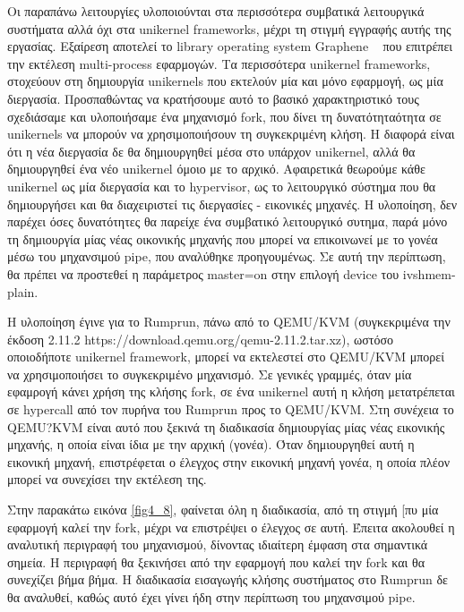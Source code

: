 Οι παραπάνω λειτουργίες υλοποιούνται στα περισσότερα συμβατικά λειτουργικά
συστήματα αλλά όχι στα unikernel frameworks, μέχρι τη στιγμή εγγραφής αυτής της
εργασίας. Εξαίρεση αποτελεί το library operating system Graphene
~\cite{tsai2014cooperation} που επιτρέπει την εκτέλεση multi-process εφαρμογών.
Τα περισσότερα unikernel frameworks, στοχεύουν στη δημιουργία unikernels που
εκτελούν μία και μόνο εφαρμογή, ως μία διεργασία. Προσπαθώντας να κρατήσουμε
αυτό το βασικό χαρακτηριστικό τους σχεδιάσαμε και υλοποιήσαμε ένα μηχανισμό
fork, που δίνει τη δυνατότηταότητα σε unikernels να μπορούν να χρησιμοποιήσουν
τη συγκεκριμένη κλήση. Η διαφορά είναι ότι η νέα διεργασία δε θα δημιουργηθεί
μέσα στο υπάρχον unikernel, αλλά θα δημιουργηθεί ένα νέο unikernel όμοιο με το
αρχικό. Αφαιρετικά θεωρούμε κάθε unikernel ως μία διεργασία και το hypervisor,
ως το λειτουργικό σύστημα που θα δημιουργήσει και θα διαχειριστεί τις διεργασίες
- εικονικές μηχανές. Η υλοποίηση, δεν παρέχει όσες δυνατότητες θα παρείχε ένα
συμβατικό λειτουργικό συτημα, παρά μόνο τη δημιουργία μίας νέας οικονικής
μηχανής που μπορεί να επικοινωνεί με το γονέα μέσω του μηχανσιμού pipe, που
αναλύθηκε προηγουμένως. Σε αυτή την περίπτωση, θα πρέπει να προστεθεί η παράμετρος master=on στην επιλογή device του ivshmem-plain.

Η υλοποίηση έγινε για το Rumprun, πάνω από το QEMU/KVM (συγκεκριμένα την έκδοση
2.11.2 https://download.qemu.org/qemu-2.11.2.tar.xz), ωστόσο οποιοδήποτε
unikernel framework, μπορεί να εκτελεστεί στο QEMU/KVM μπορεί να χρησιμοποιήσει
το συγκεκριμένο μηχανισμό. Σε γενικές γραμμές, όταν μία εφαμρογή κάνει χρήση της
κλήσης fork, σε ένα unikernel αυτή η κλήση μετατρέπεται σε hypercall από τον
πυρήνα του Rumprun προς το QEMU/KVM. Στη συνέχεια το QEMU?KVM είναι αυτό που
ξεκινά τη διαδικασία δημιουργίας μίας νέας εικονικής μηχανής, η οποία είναι ίδια
με την αρχική (γονέα). Όταν δημιουργηθεί αυτή η εικονική μηχανή, επιστρέφεται ο
έλεγχος στην εικονική μηχανή γονέα, η οποία πλέον μπορεί να συνεχίσει την
εκτέλεση της. 

Στην παρακάτω εικόνα \ref{fig4_8}, φαίνεται όλη η διαδικασία, από τη στιγμή [πυ
μία εφαρμογή καλεί την fork, μέχρι να επιστρέψει ο έλεγχος σε αυτή. Έπειτα
ακολουθεί η αναλυτική περιγραφή του μηχανισμού, δίνοντας ιδιαίτερη έμφαση στα
σημαντικά σημεία. Η περιγραφή θα ξεκινήσει από την εφαρμογή που καλεί την fork
και θα συνεχίζει βήμα βήμα. Η διαδικασία εισαγωγής κλήσης συστήματος στο Rumprun
δε θα αναλυθεί, καθώς αυτό έχει γίνει ήδη στην περίπτωση του μηχανσιμού pipe.

